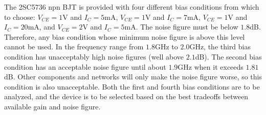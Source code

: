 The 2SC5736 npn BJT is provided with four different bias conditions from which to choose: $V_{CE} = 1$\si{\volt} and $I_{C} = 5$\si{\milli\ampere}, $V_{CE} = 1$\si{\volt} and $I_{C} = 7$\si{\milli\ampere}, $V_{CE} = 1$\si{\volt} and $I_{C} = 20$\si{\milli\ampere}, and $V_{CE} = 2$\si{\volt} and $I_{C} = 5$\si{\milli\ampere}.
The noise figure must be below $1.8$\si{\dB}.
Therefore, any bias condition whose minimum noise figure is above this level cannot be used.
In the frequency range from $1.8$\si{\giga\hertz} to $2.0$\si{\giga\hertz}, the third bias condition has unacceptably high noise figures (well above $2.1$\si{\dB}).
The second bias condition has an acceptable noise figure until about $1.9$\si{\giga\hertz} when it exceeds $1.81$\si{\dB}.
Other components and networks will only make the noise figure worse, so this condition is also unacceptable.
Both the first and fourth bias conditions are to be analyzed, and the device is to be selected based on the best tradeoffs between available gain and noise figure.
